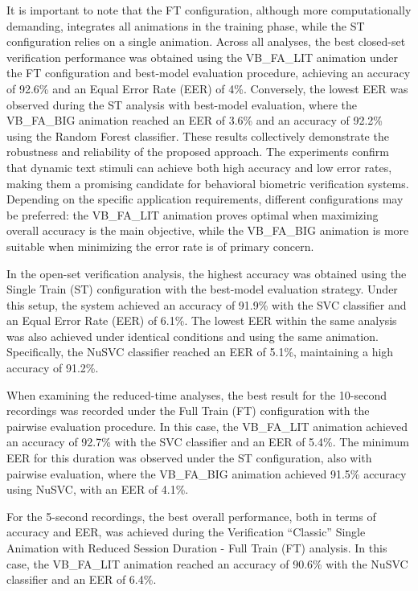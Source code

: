 \documentclass{article}
\begin{document}
It is important to note that the FT configuration, although more computationally demanding, integrates all animations in the training phase, while the ST configuration relies on a single animation. 
Across all analyses, the best closed-set verification performance was obtained using the VB\_FA\_LIT animation under the FT configuration and best-model evaluation procedure, achieving an accuracy of 92.6\% and an Equal Error Rate (EER) of 4\%. 
Conversely, the lowest EER was observed during the ST analysis with best-model evaluation, where the VB\_FA\_BIG animation reached an EER of 3.6\% and an accuracy of 92.2\% using the Random Forest classifier.
These results collectively demonstrate the robustness and reliability of the proposed approach. 
The experiments confirm that dynamic text stimuli can achieve both high accuracy and low error rates, making them a promising candidate for behavioral biometric verification systems. 
Depending on the specific application requirements, different configurations may be preferred: the VB\_FA\_LIT animation proves optimal when maximizing overall accuracy is the main objective, while the VB\_FA\_BIG animation is more suitable when minimizing the error rate is of primary concern.

In the open-set verification analysis, the highest accuracy was obtained using the Single Train (ST) configuration with the best-model evaluation strategy. 
Under this setup, the system achieved an accuracy of 91.9\% with the SVC classifier and an Equal Error Rate (EER) of 6.1\%. 
The lowest EER within the same analysis was also achieved under identical conditions and using the same animation. 
Specifically, the NuSVC classifier reached an EER of 5.1\%, maintaining a high accuracy of 91.2\%.

When examining the reduced-time analyses, the best result for the 10-second recordings was recorded under the Full Train (FT) configuration with the pairwise evaluation procedure. 
In this case, the VB\_FA\_LIT animation achieved an accuracy of 92.7\% with the SVC classifier and an EER of 5.4\%. 
The minimum EER for this duration was observed under the ST configuration, also with pairwise evaluation, where the VB\_FA\_BIG animation achieved 91.5\% accuracy using NuSVC, with an EER of 4.1\%.

For the 5-second recordings, the best overall performance, both in terms of accuracy and EER, was achieved during the Verification “Classic” Single Animation with Reduced Session Duration - Full Train (FT) analysis. 
In this case, the VB\_FA\_LIT animation reached an accuracy of 90.6\% with the NuSVC classifier and an EER of 6.4\%.
\end{document}
